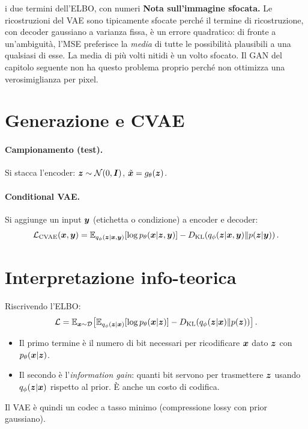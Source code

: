 \begin{esempiosvolto}{i due termini dell'ELBO, con numeri}
\textbf{Nota sull'immagine sfocata.} Le ricostruzioni del VAE sono tipicamente sfocate perché il termine di ricostruzione, con decoder gaussiano a varianza fissa, è un errore quadratico: di fronte a un'ambiguità, l'MSE preferisce la \emph{media} di tutte le possibilità plausibili a una qualsiasi di esse. La media di più volti nitidi è un volto sfocato. Il GAN del capitolo seguente non ha questo problema proprio perché non ottimizza una verosimiglianza per pixel.
\end{esempiosvolto}

\section{Generazione e CVAE}

\paragraph{Campionamento (test).} Si stacca l'encoder: $\bm{z} \sim \mathcal{N}(0,\bm{I})$, $\tilde{\bm{x}} = g_\theta(\bm{z})$.

\paragraph{Conditional VAE.} Si aggiunge un input $\bm{y}$ (etichetta o condizione) a encoder e decoder:
\[
\mathcal{L}_{\text{CVAE}}(\bm{x},\bm{y}) = \mathbb{E}_{q_\phi(\bm{z}|\bm{x},\bm{y})}[\log p_\theta(\bm{x}|\bm{z},\bm{y})] - D_{\mathrm{KL}}\!\left(q_\phi(\bm{z}|\bm{x},\bm{y}) \| p(\bm{z}|\bm{y})\right).
\]

\section{Interpretazione info-teorica}

Riscrivendo l'ELBO:
\[
\mathcal{L} = \mathbb{E}_{\bm{x}\sim\mathcal{D}}\!\left[\mathbb{E}_{q_\phi(\bm{z}|\bm{x})}[\log p_\theta(\bm{x}|\bm{z})] - D_{\mathrm{KL}}\!\left(q_\phi(\bm{z}|\bm{x}) \| p(\bm{z})\right)\right].
\]
\begin{itemize}
  \item Il primo termine è il numero di bit necessari per ricodificare $\bm{x}$ dato $\bm{z}$ con $p_\theta(\bm{x}|\bm{z})$.
  \item Il secondo è l'\emph{information gain}: quanti bit servono per trasmettere $\bm{z}$ usando $q_\phi(\bm{z}|\bm{x})$ rispetto al prior. È anche un costo di codifica.
\end{itemize}
Il VAE è quindi un codec a tasso minimo (compressione lossy con prior gaussiano).

